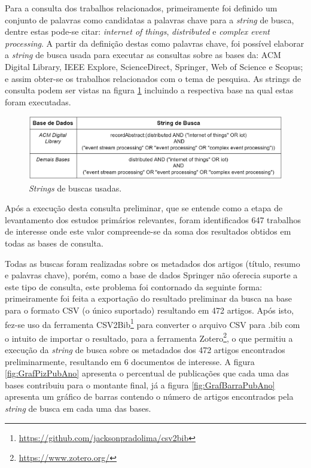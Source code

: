 \documentclass[ti,table]{texufpel} %
\begin{document}
  

Para a consulta dos trabalhos relacionados, primeiramente foi definido um conjunto de palavras como candidatas a palavras chave para a \textit{string} de busca, dentre estas pode-se citar: \textit{internet of things}, \textit{distributed} e \textit{complex event processing}. A partir da definição destas como palavras chave, foi possível elaborar a \textit{string} de busca usada para executar as consultas sobre as bases da: ACM Digital Library, IEEE Explore, ScienceDirect, Springer, Web of Science e Scopus; e assim obter-se os trabalhos relacionados com o tema de pesquisa. As strings de consulta podem ser vistas na figura \ref{tab:stringBusca} incluindo a respectiva base na qual estas foram executadas. 

  

  

  

\begin{figure}[ht] 

    \centering 

    \includegraphics[width=1\textwidth]{imagens/tabela_string_busca.png} 

    \caption{\textit{Strings} de buscas usadas.} 

    \label{tab:stringBusca} 

\end{figure} 

  

Após a execução desta consulta preliminar, que se entende como a etapa de levantamento dos estudos primários relevantes, foram identificados 647 trabalhos de interesse onde este valor compreende-se da soma dos resultados obtidos em todas as bases de consulta. 

  

Todas as buscas foram realizadas sobre os metadados dos artigos (título, resumo e palavras chave), porém, como a base de dados Springer não oferecia suporte a este tipo de consulta, este problema foi contornado da seguinte forma: primeiramente foi feita a exportação do resultado preliminar da busca na base para o formato CSV (o único suportado) resultando em 472 artigos. Após isto, fez-se uso da ferramenta CSV2Bib\footnote{\url{https://github.com/jacksonpradolima/csv2bib}} para converter o arquivo CSV para .bib com o intuito de importar o resultado, para a ferramenta Zotero\footnote{\url{https://www.zotero.org/}}, o que permitiu a execução da \textit{string} de busca sobre os metadados dos 472 artigos encontrados preliminarmente, resultando em 6 documentos de interesse. A figura \ref{fig:GrafPizPubAno} apresenta o percentual de publicações que cada uma das bases contribuiu para o montante final, já a figura  \ref{fig:GrafBarraPubAno} apresenta um gráfico de barras contendo o número de artigos encontrados pela \textit{string} de busca em cada uma das bases.
\end{document}
